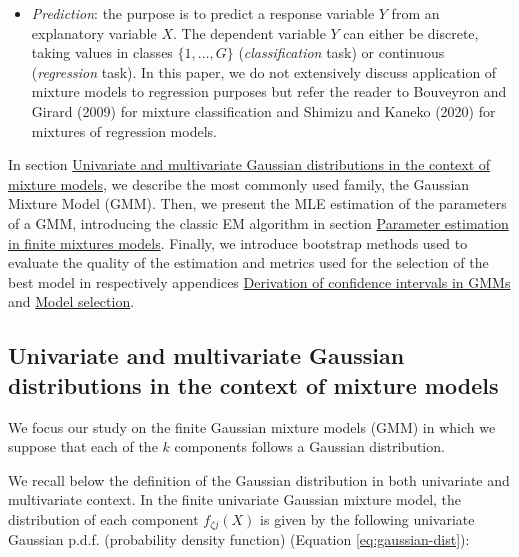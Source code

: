 \begin{itemize}
\tightlist
\item
  \emph{Prediction}: the purpose is to predict a response variable \(Y\) from
  an explanatory variable \(X\). The dependent variable \(Y\) can either
  be discrete, taking values in classes \(\{1, \ldots, G\}\)
  (\emph{classification} task) or continuous (\emph{regression} task). In this
  paper, we do not extensively discuss application of mixture models to regression purposes but refer the reader
  to Bouveyron and Girard (2009) for mixture classification and
  Shimizu and Kaneko (2020) for mixtures of regression models.
\end{itemize}

In section \protect\hyperlink{univariate-and-multivariate-gaussian-distributions-in-the-context-of-mixture-models}{Univariate and multivariate Gaussian distributions in the context of mixture models}, we describe the most
commonly used family, the Gaussian Mixture Model (GMM). Then, we present
the MLE estimation of the parameters of a GMM, introducing the classic
EM algorithm in section \protect\hyperlink{parameter-estimation-in-finite-mixtures-models}{Parameter estimation in finite mixtures models}. Finally, we introduce bootstrap methods used to evaluate the
quality of the estimation and metrics used for the selection of the best
model in respectively appendices \protect\hyperlink{derivation-of-confidence-intervals-in-gmms}{Derivation of confidence intervals in GMMs} and \protect\hyperlink{model-selection}{Model selection}.

\hypertarget{univariate-and-multivariate-gaussian-distributions-in-the-context-of-mixture-models}{%
\subsection{Univariate and multivariate Gaussian distributions in the context of mixture models}\label{univariate-and-multivariate-gaussian-distributions-in-the-context-of-mixture-models}}

We focus our study on the finite Gaussian mixture models (GMM) in which we
suppose that each of the \(k\) components follows a Gaussian
distribution.

We recall below the definition of the Gaussian
distribution in both univariate and multivariate context. In the finite univariate Gaussian mixture model, the distribution of
each component \(f_{\zeta j}(X)\) is given by the following univariate
Gaussian p.d.f. (probability density function) (Equation
\eqref{eq:gaussian-dist}):

